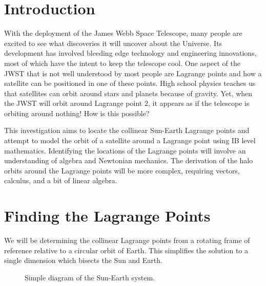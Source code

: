 \documentclass[12pt]{article}
\begin{document}
	
	
	\tableofcontents
	
	\newpage
	
	\section{Introduction}
	
	With the deployment of the James Webb Space Telescope, many people are excited to see what discoveries it will uncover about the Universe.
	Its development has involved bleeding edge technology and engineering innovations, most of which have the intent to keep the telescope cool. %
	One aspect of the JWST that is not well understood by most people are Lagrange points and how a satellite can be positioned in one of these points.
	High school physics teaches us that satellites can orbit around stars and planets because of gravity.
	Yet, when the JWST will orbit around Lagrange point 2, it appears as if the telescope is orbiting around nothing!
	How is this possible?
	
	This investigation aims to locate the collinear Sun-Earth Lagrange points and attempt to model the orbit of a satellite around a Lagrange point using IB level mathematics.
	Identifying the locations of the Lagrange points will involve an understanding of algebra and Newtonian mechanics.
	The derivation of the halo orbits around the Lagrange points will be more complex, requiring vectors, calculus, and a bit of linear algebra.
	
	\section{Finding the Lagrange Points}
	
	We will be determining the collinear Lagrange points from a rotating frame of reference relative to a circular orbit of Earth.
	This simplifies the solution to a single dimension which bisects the Sun and Earth. %
	
	\vspace*{0.5cm}
	\begin{figure}[!h]
		\centering
		\vspace*{0.25cm}
		\caption{Simple diagram of the Sun-Earth system.}
		\label{fig:collinear-coords}
	\end{figure}
\end{document}
